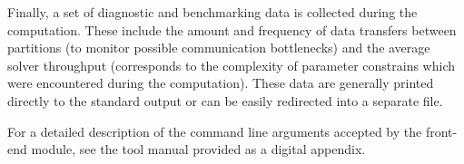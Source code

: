Finally, a set of diagnostic and benchmarking data is collected during the computation. These include the amount and frequency of data transfers between partitions (to monitor possible communication bottlenecks) and the average solver throughput (corresponds to the complexity of parameter constrains which were encountered during the computation). These data are generally printed directly to the standard output or can be easily redirected into a separate file.

For a detailed description of the command line arguments accepted by the front-end module, see the tool manual provided as a digital appendix.

